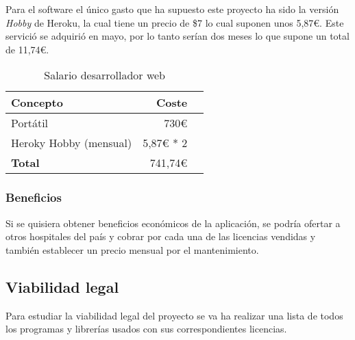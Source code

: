Para el software el único gasto que ha supuesto este proyecto ha sido la versión \textit{Hobby} de Heroku, la cual tiene un precio de \$7 lo cual suponen unos 5,87€. Este servició se adquirió en mayo, por lo tanto serían dos meses lo que supone un total de 11,74€.

\begin{table}[H]
	 \begin{tabularx}{\linewidth}{X r r}
	 	\toprule \textbf{Concepto} & \textbf{Coste} \\
	 	\toprule
        Portátil &  730€\\
        Heroky Hobby (mensual) & 5,87€ * 2   \\
        \midrule
	    \textbf{Total} & 741,74€  \\
	 	\bottomrule
	 \end{tabularx}
	 \caption{Salario desarrollador web}
\end{table}

\subsubsection{Beneficios}

Si se quisiera obtener beneficios económicos de la aplicación, se podría ofertar a otros hospitales del país y cobrar por cada una de las licencias vendidas y también establecer un precio mensual por el mantenimiento.

\subsection{Viabilidad legal}

Para estudiar la viabilidad legal del proyecto se va ha realizar una lista de todos los programas y librerías usados con sus correspondientes licencias.

